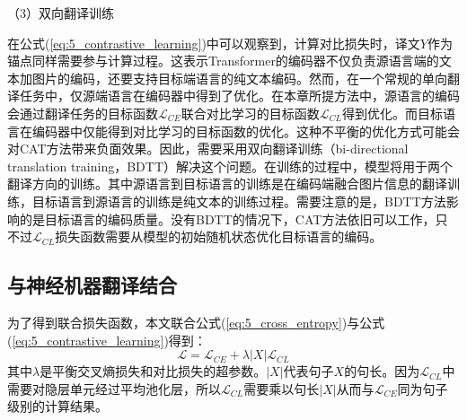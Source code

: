 {\sffamily （3）双向翻译训练}

在公式(\ref{eq:5_contrastive_learning})中可以观察到，计算对比损失时，译文$Y$作为锚点同样需要参与计算过程。这表示Transformer的编码器不仅负责源语言端的文本加图片的编码，还要支持目标端语言的纯文本编码。然而，在一个常规的单向翻译任务中，仅源端语言在编码器中得到了优化。在本章所提方法中，源语言的编码会通过翻译任务的目标函数$\mathcal{L}_{CE}$联合对比学习的目标函数$\mathcal{L}_{CL}$得到优化。而目标语言在编码器中仅能得到对比学习的目标函数的优化。这种不平衡的优化方式可能会对CAT方法带来负面效果。因此，需要采用双向翻译训练（bi-directional translation training，BDTT）解决这个问题。在训练的过程中，模型将用于两个翻译方向的训练。其中源语言到目标语言的训练是在编码端融合图片信息的翻译训练，目标语言到源语言的训练是纯文本的训练过程。需要注意的是，BDTT方法影响的是目标语言的编码质量。没有BDTT的情况下，CAT方法依旧可以工作，只不过$\mathcal{L}_{CL}$损失函数需要从模型的初始随机状态优化目标语言的编码。

\subsection{与神经机器翻译结合}
\label{sec:5_combine_with_nmt}

为了得到联合损失函数，本文联合公式(\ref{eq:5_cross_entropy})与公式(\ref{eq:5_contrastive_learning})得到：
\begin{equation}
    \mathcal{L}=\mathcal{L}_{CE} + \lambda|X|\mathcal{L}_{CL}
    \label{eq:5_combine_with_nmt}
\end{equation}
其中$\lambda$是平衡交叉熵损失和对比损失的超参数。$|X|$代表句子$X$的句长。因为$\mathcal{L}_{CL}$中需要对隐层单元经过平均池化层，所以$\mathcal{L}_{CL}$需要乘以句长$|X|$从而与$\mathcal{L}_{CE}$同为句子级别的计算结果。
